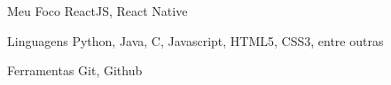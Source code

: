 
\begin{cvskills}
  \cvskill
    {Meu Foco}
    {ReactJS, React Native}
  
  \cvskill
    {Linguagens}
    {Python, Java, C, Javascript, HTML5, CSS3, entre outras}

  \cvskill
    {Ferramentas}
    {Git, Github}
    
\end{cvskills}
